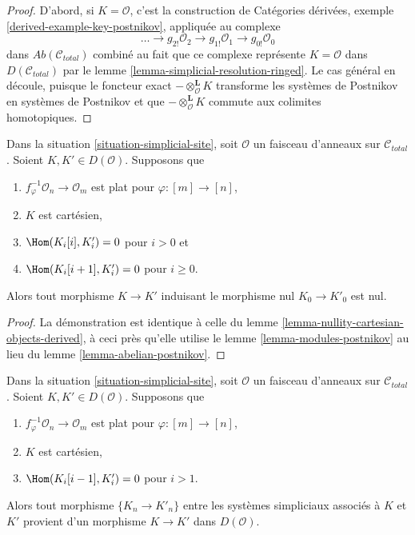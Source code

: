 \begin{proof}
D'abord, si $K = \mathcal{O}$, c'est la construction de
Catégories dérivées, exemple \ref{derived-example-key-postnikov},
appliquée au complexe
$$
\ldots \to
g_{2!}\mathcal{O}_2 \to
g_{1!}\mathcal{O}_1 \to
g_{0!}\mathcal{O}_0
$$
dans $\textit{Ab}(\mathcal{C}_{total})$ combiné au fait que
ce complexe représente $K = \mathcal{O}$ dans $D(\mathcal{C}_{total})$
par le lemme \ref{lemma-simplicial-resolution-ringed}.
Le cas général en découle, puisque le foncteur exact
$- \otimes^\mathbf{L}_\mathcal{O} K$ transforme les systèmes de Postnikov en
systèmes de Postnikov et
que $- \otimes^\mathbf{L}_\mathcal{O} K$ commute aux colimites homotopiques.
\end{proof}

\begin{lemma}
\label{lemma-nullity-cartesian-modules-derived}
Dans la situation \ref{situation-simplicial-site}, soit $\mathcal{O}$
un faisceau d'anneaux sur $\mathcal{C}_{total}$.
Soient $K, K' \in D(\mathcal{O})$.
Supposons que
\begin{enumerate}
\item $f_\varphi^{-1}\mathcal{O}_n \to \mathcal{O}_m$ est plat pour
$\varphi : [m] \to [n]$,
\item $K$ est cartésien,
\item $\Hom(K_i[i], K'_i) = 0$ pour $i > 0$ et
\item $\Hom(K_i[i + 1], K'_i) = 0$ pour $i \geq 0$.
\end{enumerate}
Alors tout morphisme $K \to K'$ induisant le morphisme nul $K_0 \to K'_0$ est nul.
\end{lemma}

\begin{proof}
La démonstration est identique à celle du
lemme \ref{lemma-nullity-cartesian-objects-derived}, à ceci près qu'elle utilise le
lemme \ref{lemma-modules-postnikov} au lieu du
lemme \ref{lemma-abelian-postnikov}.
\end{proof}

\begin{lemma}
\label{lemma-hom-cartesian-modules-derived}
Dans la situation \ref{situation-simplicial-site}, soit $\mathcal{O}$
un faisceau d'anneaux sur $\mathcal{C}_{total}$.
Soient $K, K' \in D(\mathcal{O})$.
Supposons que
\begin{enumerate}
\item $f_\varphi^{-1}\mathcal{O}_n \to \mathcal{O}_m$ est plat pour
$\varphi : [m] \to [n]$,
\item $K$ est cartésien,
\item $\Hom(K_i[i - 1], K'_i) = 0$ pour $i > 1$.
\end{enumerate}
Alors tout morphisme $\{K_n \to K'_n\}$ entre les systèmes simpliciaux associés
à $K$ et $K'$ provient d'un morphisme $K \to K'$ dans $D(\mathcal{O})$.
\end{lemma}

